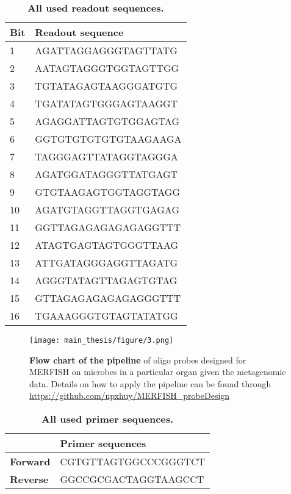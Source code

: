 \documentclass[10pt,letterpaper]{article}
\begin{document}
\begin{table}[H]
\caption{{\bf All used readout sequences.}}
\begin{tabular}{|l|l|}
\hline
\textbf{Bit} & \textbf{Readout sequence} \\ \hline
1            & AGATTAGGAGGGTAGTTATG      \\ \hline
2            & AATAGTAGGGTGGTAGTTGG      \\ \hline
3            & TGTATAGAGTAAGGGATGTG      \\ \hline
4            & TGATATAGTGGGAGTAAGGT      \\ \hline
5            & AGAGGATTAGTGTGGAGTAG      \\ \hline
6            & GGTGTGTGTGTGTAAGAAGA      \\ \hline
7            & TAGGGAGTTATAGGTAGGGA      \\ \hline
8            & AGATGGATAGGGTTATGAGT      \\ \hline
9            & GTGTAAGAGTGGTAGGTAGG      \\ \hline
10           & AGATGTAGGTTAGGTGAGAG      \\ \hline
11           & GGTTAGAGAGAGAGAGGTTT      \\ \hline
12           & ATAGTGAGTAGTGGGTTAAG      \\ \hline
13           & ATTGATAGGGAGGTTAGATG      \\ \hline
14           & AGGGTATAGTTAGAGTGTAG      \\ \hline
15           & GTTAGAGAGAGAGAGGGTTT      \\ \hline
16           & TGAAAGGGTGTAGTATATGG      \\ \hline
\end{tabular}
\label{table1}
\end{table}

\begin{figure}[H]
    \centering
    \caption{\textbf{Flow chart of the pipeline} of oligo probes designed for MERFISH on microbes in a particular organ given the metagenomic data. Details on how to apply the pipeline can be found through \url{https://github.com/npxhuy/MERFISH_probeDesign}}
    \centering
    \texttt{[image: main\_thesis/figure/3.png]} 
    \label{fig3}
\end{figure}
\pagebreak




\begin{table}[H]
\caption{{\bf All used primer sequences.}}
\begin{tabular}{|l|l|}
\hline
\textbf{}        & \textbf{Primer sequences} \\ \hline
\textbf{Forward} & CGTGTTAGTGGCCCGGGTCT      \\ \hline
\textbf{Reverse} & GGCCGCGACTAGGTAAGCCT      \\ \hline
\end{tabular}
\label{table2}
\end{table}
\end{document}
